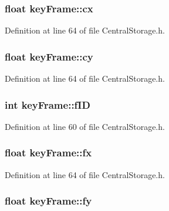 \hypertarget{structkeyFrame_a237a54d29c13a64b8a3d4a597ab061c5}{
\subsubsection[{cx}]{\setlength{\rightskip}{0pt plus 5cm}float {\bf key\-Frame\-::cx}}}\label{structkeyFrame_a237a54d29c13a64b8a3d4a597ab061c5}


\-Definition at line 64 of file \-Central\-Storage.\-h.

\hypertarget{structkeyFrame_ac9d3a851908cfd7587fb3e7859087e5d}{
\subsubsection[{cy}]{\setlength{\rightskip}{0pt plus 5cm}float {\bf key\-Frame\-::cy}}}\label{structkeyFrame_ac9d3a851908cfd7587fb3e7859087e5d}


\-Definition at line 64 of file \-Central\-Storage.\-h.

\hypertarget{structkeyFrame_a8bbbb8e728fff6f1ee05bd8c4f846099}{
\subsubsection[{f\-I\-D}]{\setlength{\rightskip}{0pt plus 5cm}int {\bf key\-Frame\-::f\-I\-D}}}\label{structkeyFrame_a8bbbb8e728fff6f1ee05bd8c4f846099}


\-Definition at line 60 of file \-Central\-Storage.\-h.

\hypertarget{structkeyFrame_a145d6d5ab1e2da4d59d34000152111cd}{
\subsubsection[{fx}]{\setlength{\rightskip}{0pt plus 5cm}float {\bf key\-Frame\-::fx}}}\label{structkeyFrame_a145d6d5ab1e2da4d59d34000152111cd}


\-Definition at line 64 of file \-Central\-Storage.\-h.

\hypertarget{structkeyFrame_a48af06b30b2f6f5a73e61afddb7ea0c4}{
\subsubsection[{fy}]{\setlength{\rightskip}{0pt plus 5cm}float {\bf key\-Frame\-::fy}}}\label{structkeyFrame_a48af06b30b2f6f5a73e61afddb7ea0c4}


